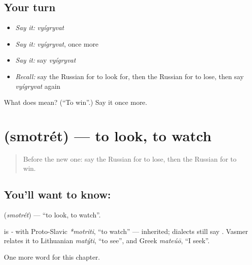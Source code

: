 \subsection*{Your turn}
\begin{itemize}
\raggedright
  \item \emph{Say it:} \emph{vyígryvat}
  \item \emph{Say it:} \emph{vyígryvat}, once more
  \item \emph{Say it:} say \emph{vyígryvat}
  \item \emph{Recall:} say the Russian for to look for, then the Russian for to lose, then say \emph{vyígryvat} again
\end{itemize}

\begin{tcolorbox}[breakable,colback=teal!4,colframe=teal!35!black,title={Before you move on}]
What does  mean? (\textquotedblleft{}To win\textquotedblright{}.) Say it once more.
\end{tcolorbox}
\section[\texorpdfstring{\ru{смотреть} (smotrét)}{смотреть (smotrét)}]{ (smotrét) — to look, to watch}

\label{lesson:RU-C135-to-look}



\begin{quote}
Before the new one: say the Russian for to lose, then the Russian for to win.
\end{quote}

\subsection*{You'll want to know: }
\textbf{} (\emph{smotrét}) — \textquotedblleft{}to look, to watch\textquotedblright{}.

\begin{cousinweb}
\textbf{} is \emph{-} with Proto-Slavic \emph{*motriti}, \textquotedblleft{}to watch\textquotedblright{} — inherited; dialects still say \emph{}. Vasmer relates it to Lithuanian \emph{matýti}, \textquotedblleft{}to see\textquotedblright{}, and Greek \emph{mateúō}, \textquotedblleft{}I seek\textquotedblright{}.
\end{cousinweb}

\begin{grammarlens}[title={What you've built}]
One more word for this chapter.
\end{grammarlens}

